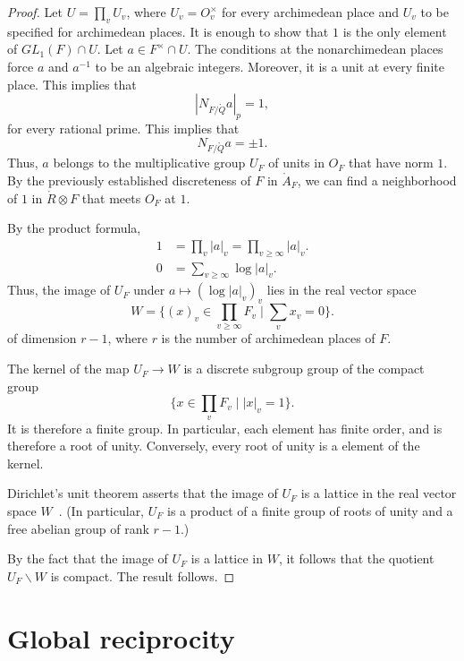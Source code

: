 \documentclass{amsart}
\def\abs#1{{|#1|}}
\def\RR{\ring{R}}
\def\AA{\ring{A}}
\begin{document}
\begin{proof} Let $U = \prod_v U_v$, where $U_v = O_v^\times$ for
  every archimedean place and $U_v$ to be specified for archimedean
  places.  It is enough to show that $1$ is the only element of
  $GL_1(F)\cap U$.  Let $a\in F^\times \cap U$.  The conditions at the
  nonarchimedean places force $a$ and $a^{-1}$ to be an algebraic integers.
  Moreover, it is a unit at every finite place.  
This implies that
\[
|N_{F/\ring{Q}} a|_p = 1,
\]
for every rational prime.  This implies that
\[
N_{F/\ring{Q}} a = \pm 1.
\]
Thus, $a$ belongs to the multiplicative group $U_F$ of units in $O_F$
that have norm $1$.  By the previously established discreteness of $F$
in $\AA_F$, we can find a neighborhood of $1$  in $\RR\otimes F$ that
meets $O_F$ at $1$.  

By the product formula,
\begin{align*}
1 &= \prod_v \abs{a}_v = \prod_{v\ge\infty} \abs{a}_v.\\
0 &= \sum_{v\ge\infty} \log \abs{a}_v.
\end{align*}
Thus, the image of $U_F$ under $a \mapsto (\log\abs{a}_v)_v$ 
lies in the real vector space
\[
W = \{ (x)_v \in \prod_{v\ge\infty} F_v \mid \sum_v x_v = 0\}.
\]
of dimension $r-1$, where $r$ is the number of archimedean places of $F$.

The kernel of the map $U_F\to W$ is a discrete subgroup group of 
the compact group 
\[
\{x\in \prod_v F_v \mid |x|_v=1\}.
\]
It is therefore a finite group.  In particular, each element has finite order,
and is therefore a root of unity.  Conversely, every root of unity is a element
of the kernel.


Dirichlet's unit theorem asserts that the image of $U_F$ is a lattice
in the real vector space $W$~\cite[Th.~5.13]{knapp-advanced}.  (In particular, $U_F$
is a product of a finite group of roots of unity and a free abelian
group of rank $r-1$.)


By the fact that the image of $U_F$ is a lattice in
$W$, it follows that the quotient $U_F\backslash W$ is compact.  The
result follows.
\end{proof}




\newpage
\section{Global reciprocity}
\end{document}
